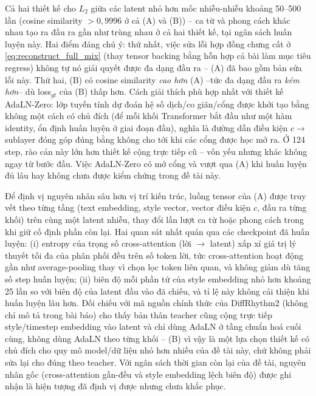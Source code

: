 \documentclass[a4paper,13pt,oneside]{report}
\begin{document}
Cả hai thiết kế cho $L_2$ giữa các latent nhỏ hơn mốc nhiễu-nhiễu khoảng 50--500 lần
(cosine similarity $>0{,}9996$ ở cả (A) và (B)) -- ca từ và phong cách khác nhau tạo ra đầu
ra gần như trùng nhau ở cả hai thiết kế, tại ngân sách huấn luyện này. Hai điểm đáng chú ý:
thứ nhất, việc sửa lỗi hợp đồng chưng cất ở \eqref{eq:reconstruct_full_mix} (thay tensor
backing bằng hỗn hợp cả bài làm mục tiêu regress) không tự nó giải quyết được đa dạng đầu
ra -- (A) đã bao gồm bản sửa lỗi này. Thứ hai, (B) có cosine similarity \emph{cao hơn} (A)
--tức đa dạng đầu ra \emph{kém hơn}-- dù loss$_{gt}$ của (B) thấp hơn. Cách giải thích phù
hợp nhất với thiết kế AdaLN-Zero: lớp tuyến tính dự đoán hệ số dịch/co giãn/cổng được khởi
tạo bằng không một cách có chủ đích (để mỗi khối Transformer bắt đầu như một hàm identity,
ổn định huấn luyện ở giai đoạn đầu), nghĩa là đường dẫn điều kiện $c\to$ sublayer đóng góp
đúng bằng không cho tới khi các cổng được học mở ra. Ở 124 step, rào cản này lớn hơn thiết
kế cộng trực tiếp cũ -- vốn yếu nhưng khác không ngay từ bước đầu. Việc AdaLN-Zero có mở
cổng và vượt qua (A) khi huấn luyện đủ lâu hay không chưa được kiểm chứng trong đề tài này.

Để định vị nguyên nhân sâu hơn vị trí kiến trúc, luồng tensor của (A) được truy vết theo
từng tầng (text embedding, style vector, vector điều kiện $c$, đầu ra từng khối) trên cùng
một latent nhiễu, thay đổi lần lượt ca từ hoặc phong cách trong khi giữ cố định phần còn
lại. Hai quan sát nhất quán qua các checkpoint đã huấn luyện: (i) entropy của trọng số
cross-attention (lời $\to$ latent) xấp xỉ giá trị lý thuyết tối đa của phân phối đều trên
số token lời, tức cross-attention hoạt động gần như average-pooling thay vì chọn lọc token
liên quan, và không giảm dù tăng số step huấn luyện; (ii) biên độ mỗi phần tử của style
embedding nhỏ hơn khoảng 25 lần so với biên độ của latent đầu vào đã chiếu, và tỉ lệ này
không cải thiện khi huấn luyện lâu hơn. Đối chiếu với mã nguồn chính thức của DiffRhythm2
(không chỉ mô tả trong bài báo) cho thấy bản thân teacher cũng cộng trực tiếp style/timestep
embedding vào latent và chỉ dùng AdaLN ở tầng chuẩn hoá cuối cùng, không dùng AdaLN theo
từng khối -- (B) vì vậy là một lựa chọn thiết kế có chủ đích cho quy mô model/dữ liệu nhỏ
hơn nhiều của đề tài này, chứ không phải sửa lại cho đúng theo teacher. Với ngân sách thời
gian còn lại của đề tài, nguyên nhân gốc (cross-attention gần-đều và style embedding lệch
biên độ) được ghi nhận là hiện tượng đã định vị được nhưng chưa khắc phục.
\end{document}
